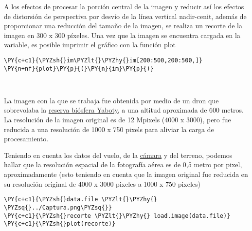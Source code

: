     A los efectos de procesar la porción central de la imagen y reducir así
los efectos de distorsión de perspectiva por desvío de la línea vertical
nadir-cenit, además de proporcionar una reducción del tamaño de la
imagen, se realiza un recorte de la imagen en 300 x 300 píxeles. Una vez
que la imagen se encuentra cargada en la variable, es posible imprimir
el gráfico con la función plot

    \begin{tcolorbox}[breakable, size=fbox, boxrule=1pt, pad at break*=1mm,colback=cellbackground, colframe=cellborder]
\begin{Verbatim}[commandchars=\\\{\}]
\PY{c+c1}{\PYZsh{}im\PYZlt{}\PYZhy{}im[200:500,200:500,]}
\PY{n+nf}{plot}\PY{p}{(}\PY{n}{im}\PY{p}{)}
\end{Verbatim}
\end{tcolorbox}

    \begin{center}
    \end{center}
    { \hspace*{\fill} \\}
    
    La imagen con la que se trabaja fue obtenida por medio de un dron que
sobrevolaba la \href{https://sib.gob.ar/area/MISIONES*YB*YABOTY}{reserva
biósfera Yaboty}, a una altitud aproximada de 600 metros. La resolución
de la imagen original es de 12 Mpixels (4000 x 3000), pero fue reducida
a una resolución de 1000 x 750 pixels para aliviar la carga de
procesamiento.

    Teniendo en cuenta los datos del vuelo, de la
\href{https://www.dji.com/phantom-4/info}{cámara} y del terreno, podemos
hallar que la resolución espacial de la fotografía aérea es de 0,5 metro
por pixel, aproximadamente (esto teniendo en cuenta que la imagen
original fue reducida en su resolución original de 4000 x 3000 pixeles a
1000 x 750 pixeles)

    \begin{tcolorbox}[breakable, size=fbox, boxrule=1pt, pad at break*=1mm,colback=cellbackground, colframe=cellborder]
\begin{Verbatim}[commandchars=\\\{\}]
\PY{c+c1}{\PYZsh{}data.file \PYZlt{}\PYZhy{} \PYZsq{}../Captura.png\PYZsq{}}
\PY{c+c1}{\PYZsh{}recorte \PYZlt{}\PYZhy{} load.image(data.file)}
\PY{c+c1}{\PYZsh{}plot(recorte)}
\end{Verbatim}
\end{tcolorbox}

